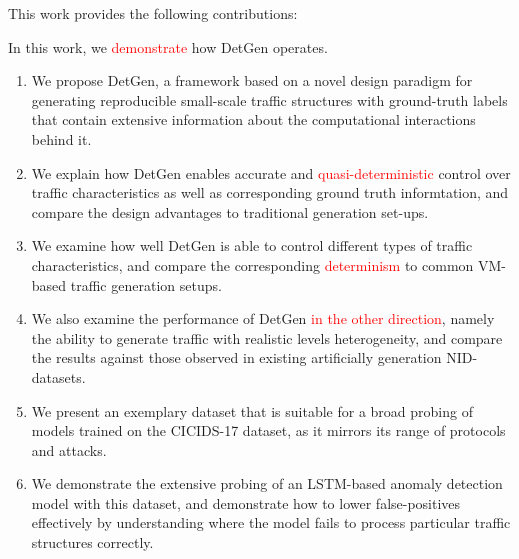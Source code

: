 \documentclass[runningheads]{llncs}
\begin{document}

 
This work provides the following contributions:



In this work, we \textcolor{red}{demonstrate} how DetGen operates. 
\begin{enumerate}
\item We propose DetGen, a framework based on a novel design paradigm for generating reproducible small-scale traffic structures with ground-truth labels that contain extensive information about the computational interactions behind it. 

\item We explain how DetGen enables accurate and \textcolor{red}{quasi-deterministic} control over traffic characteristics as well as corresponding ground truth informtation, and compare the design advantages to traditional generation set-ups.

\item We examine how well DetGen is able to control different types of traffic characteristics, and compare the corresponding \textcolor{red}{determinism} to common VM-based traffic generation setups.

\item We also examine the performance of DetGen \textcolor{red}{in the other direction}, namely the ability to generate traffic with realistic levels heterogeneity, and compare the results against those observed in existing artificially generation NID-datasets.

\item We present an exemplary dataset that is suitable for a broad probing of models trained on the CICIDS-17 dataset, as it mirrors its range of protocols and attacks.

\item We demonstrate the extensive probing of an LSTM-based anomaly detection model with this dataset, and demonstrate how to lower false-positives effectively by understanding where the model fails to process particular traffic structures correctly.
\end{enumerate}
\end{document}

